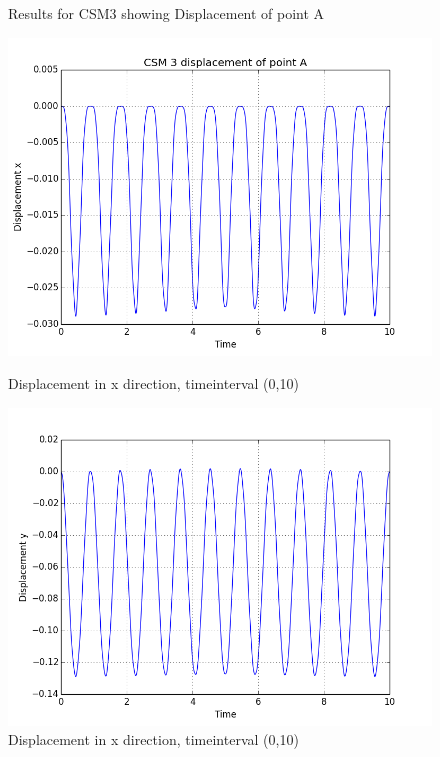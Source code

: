 \begin{figure}[H]  \label{plot:CSM3_plots} 
\centering
  \caption {Results for CSM3 showing Displacement of point A}
  \begin{minipage}[b]{0.60\linewidth}
    \centering
    \includegraphics[width=0.9\linewidth,trim={2mm 2mm 5mm 5mm},clip]{./Verification_Validation//Hron_Turek/dis_x.png} 
    \caption{Displacement in x direction, timeinterval (0,10)} 
    \vspace{4ex}
  \end{minipage}%
  \begin{minipage}[b]{0.60\linewidth}
    \centering
    \includegraphics[width=0.9\linewidth,trim={2mm 2mm 5mm 5mm},clip]{./Verification_Validation//Hron_Turek/dis_y.png} 
    \caption{Displacement in x direction, timeinterval (0,10)} 
    \vspace{4ex}
  \end{minipage} 

\end{figure}

